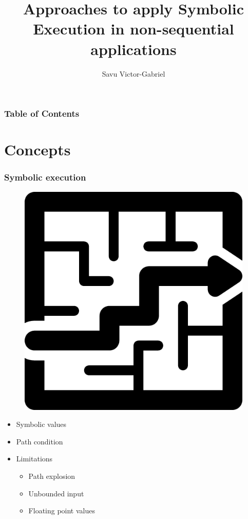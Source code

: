 \documentclass{beamer}
\title{Approaches to apply Symbolic Execution in non-sequential applications}
\author{Savu Victor-Gabriel}
\institute{Technische Universität München, \email{victorsavu3@gmail.com}}
\begin{document}
	\frame{\titlepage}
	
	\begin{frame}
		\frametitle{Table of Contents}
		\tableofcontents
	\end{frame}
	
	\section{Concepts}
	
	\begin{frame}
		\frametitle{Symbolic execution}
		
		\begin{figure}[htbp]
			\centering
			\includegraphics[scale=0.1]{exit}
		\end{figure}
		
		\begin{itemize}
			\item Symbolic values
			\item Path condition
			\item Limitations
			\begin{itemize}
				\item Path explosion
				\item Unbounded input
				\item Floating point values
			\end{itemize}
		\end{itemize}
	\end{frame}
	
\end{document}
